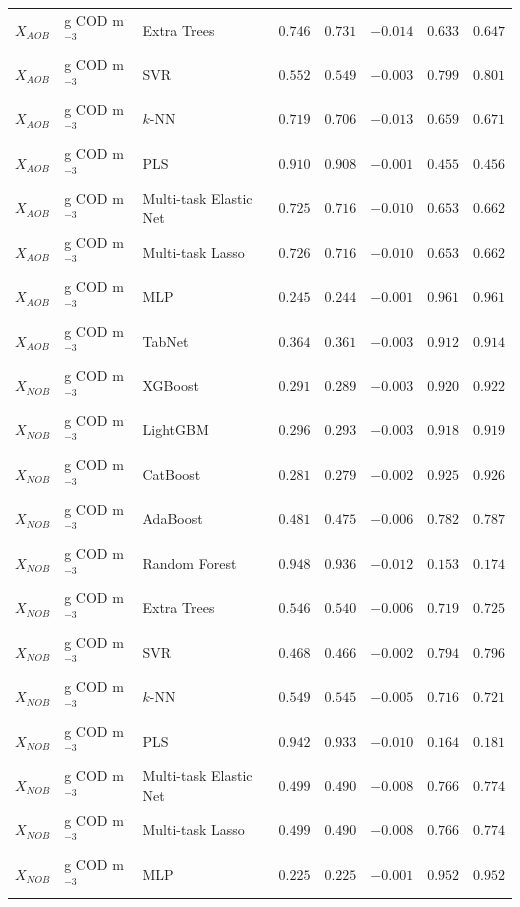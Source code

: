 \begin{longtable}{llp{3.1cm}rrrrr}
$X_{AOB}$ & g COD m$^{-3}$ & Extra Trees & $0.746$ & $0.731$ & $-0.014$ & $0.633$ & $0.647$ \\
$X_{AOB}$ & g COD m$^{-3}$ & SVR & $0.552$ & $0.549$ & $-0.003$ & $0.799$ & $0.801$ \\
$X_{AOB}$ & g COD m$^{-3}$ & $k$-NN & $0.719$ & $0.706$ & $-0.013$ & $0.659$ & $0.671$ \\
$X_{AOB}$ & g COD m$^{-3}$ & PLS & $0.910$ & $0.908$ & $-0.001$ & $0.455$ & $0.456$ \\
$X_{AOB}$ & g COD m$^{-3}$ & Multi-task Elastic Net & $0.725$ & $0.716$ & $-0.010$ & $0.653$ & $0.662$ \\
$X_{AOB}$ & g COD m$^{-3}$ & Multi-task Lasso & $0.726$ & $0.716$ & $-0.010$ & $0.653$ & $0.662$ \\
$X_{AOB}$ & g COD m$^{-3}$ & MLP & $0.245$ & $0.244$ & $-0.001$ & $0.961$ & $0.961$ \\
$X_{AOB}$ & g COD m$^{-3}$ & TabNet & $0.364$ & $0.361$ & $-0.003$ & $0.912$ & $0.914$ \\
$X_{NOB}$ & g COD m$^{-3}$ & XGBoost & $0.291$ & $0.289$ & $-0.003$ & $0.920$ & $0.922$ \\
$X_{NOB}$ & g COD m$^{-3}$ & LightGBM & $0.296$ & $0.293$ & $-0.003$ & $0.918$ & $0.919$ \\
$X_{NOB}$ & g COD m$^{-3}$ & CatBoost & $0.281$ & $0.279$ & $-0.002$ & $0.925$ & $0.926$ \\
$X_{NOB}$ & g COD m$^{-3}$ & AdaBoost & $0.481$ & $0.475$ & $-0.006$ & $0.782$ & $0.787$ \\
$X_{NOB}$ & g COD m$^{-3}$ & Random Forest & $0.948$ & $0.936$ & $-0.012$ & $0.153$ & $0.174$ \\
$X_{NOB}$ & g COD m$^{-3}$ & Extra Trees & $0.546$ & $0.540$ & $-0.006$ & $0.719$ & $0.725$ \\
$X_{NOB}$ & g COD m$^{-3}$ & SVR & $0.468$ & $0.466$ & $-0.002$ & $0.794$ & $0.796$ \\
$X_{NOB}$ & g COD m$^{-3}$ & $k$-NN & $0.549$ & $0.545$ & $-0.005$ & $0.716$ & $0.721$ \\
$X_{NOB}$ & g COD m$^{-3}$ & PLS & $0.942$ & $0.933$ & $-0.010$ & $0.164$ & $0.181$ \\
$X_{NOB}$ & g COD m$^{-3}$ & Multi-task Elastic Net & $0.499$ & $0.490$ & $-0.008$ & $0.766$ & $0.774$ \\
$X_{NOB}$ & g COD m$^{-3}$ & Multi-task Lasso & $0.499$ & $0.490$ & $-0.008$ & $0.766$ & $0.774$ \\
$X_{NOB}$ & g COD m$^{-3}$ & MLP & $0.225$ & $0.225$ & $-0.001$ & $0.952$ & $0.952$ \\

\end{longtable}
